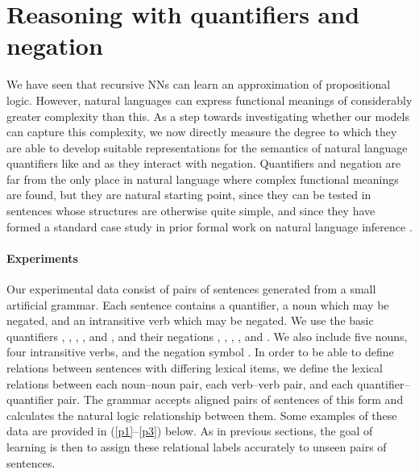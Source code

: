 \section{Reasoning with quantifiers and negation}\label{sec:quantifiers}

We have seen that recursive NNs can learn an approximation of propositional
logic.  However, natural languages can express functional meanings of
considerably greater complexity than this.  As a step towards
investigating whether our models can capture this complexity, we now
directly measure the degree to which they are able to
develop suitable representations for the semantics of natural language
quantifiers like  and  as they interact with negation. Quantifiers 
and negation are far from
the only place in natural language where complex functional meanings
are found, but they are natural starting point, since they can be tested
in sentences whose structures are otherwise quite simple, and since they have
formed a standard case study in prior formal work on natural
language inference \cite{Icard:Moss:2013:LILT}.

\paragraph{Experiments}
Our experimental data consist of pairs of sentences generated from a
small artificial grammar. Each sentence contains a quantifier, a noun
which may be negated, and an intransitive verb which may be
negated. We use the basic quantifiers , , ,
, and , and their negations , ,
, , and . We also
include five nouns, four intransitive verbs, and the negation symbol
. In order to be able to define relations between sentences
with differing lexical items, we define the lexical relations between
each noun--noun pair, each verb--verb pair, and each
quantifier--quantifier pair. The grammar accepts aligned pairs of
sentences of this form and calculates the natural logic relationship
between them.  Some examples of these data are provided in (\ref{p1}--\ref{p3}) below.
  As in previous sections, the goal of
learning is then to assign these relational labels accurately to
unseen pairs of sentences.


